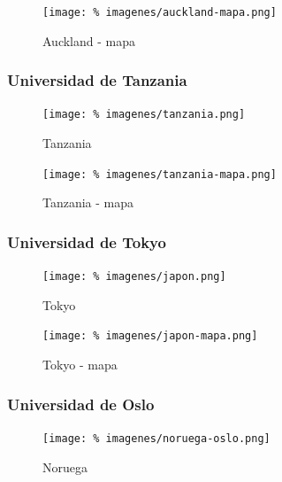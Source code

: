 \documentclass[final,inline,a4paper,narroweqnarray]{ieee}
\begin{document}
\begin{figure}[ht]\begin{center}
   \texttt{[image: \%
    imagenes/auckland-mapa.png]}
    \caption{Auckland - mapa}
    \label{Auckland}
\end{center}\end{figure}

\subsubsection{Universidad de Tanzania}
\begin{figure}[ht]\begin{center}
   \texttt{[image: \%
    imagenes/tanzania.png]}
    \caption{Tanzania}
    \label{Tanzania}
\end{center}\end{figure}

\begin{figure}[ht]\begin{center}
   \texttt{[image: \%
    imagenes/tanzania-mapa.png]}
    \caption{Tanzania - mapa}
    \label{Tanzania}
\end{center}\end{figure}

\subsubsection{Universidad de Tokyo}
\begin{figure}[ht]\begin{center}
   \texttt{[image: \%
    imagenes/japon.png]}
    \caption{Tokyo}
    \label{Tokyo}
\end{center}\end{figure}

\begin{figure}[ht]\begin{center}
   \texttt{[image: \%
    imagenes/japon-mapa.png]}
    \caption{Tokyo - mapa}
    \label{Tokyo}
\end{center}\end{figure}

\subsubsection{Universidad de Oslo}
\begin{figure}[ht]\begin{center}
   \texttt{[image: \%
    imagenes/noruega-oslo.png]}
    \caption{Noruega}
    \label{Noruega}
\end{center}\end{figure}
\end{document}
